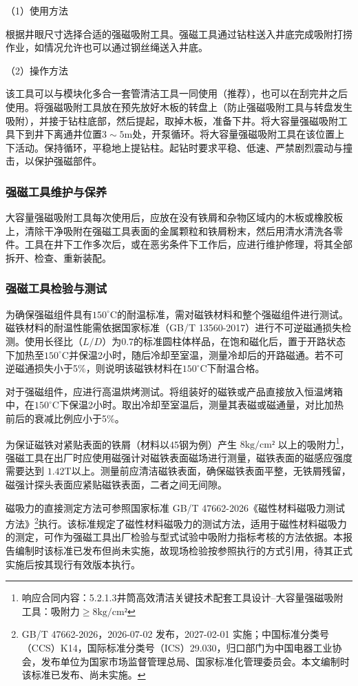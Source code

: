 （1）使用方法

根据井眼尺寸选择合适的强磁吸附工具。强磁工具通过钻柱送入井底完成吸附打捞作业，如情况允许也可以通过钢丝绳送入井底。

（2）操作方法

该工具可以与模块化多合一套管清洁工具一同使用（推荐），也可以在刮完井之后使用。将强磁吸附工具放在预先放好木板的转盘上（防止强磁吸附工具与转盘发生吸附），并接于钻柱底部，然后提起，取掉木板，准备下井。将大容量强磁吸附工具下到井下离通井位置$3\sim 5\mathrm{m}$处，开泵循环。将大容量强磁吸附工具在该位置上下活动。保持循环，平稳地上提钻柱。起钻时要求平稳、低速、严禁剧烈震动与撞击，以保护强磁部件。

\subsubsection{强磁工具维护与保养}

大容量强磁吸附工具每次使用后，应放在没有铁屑和杂物区域内的木板或橡胶板上，清除干净吸附在强磁工具表面的金属颗粒和铁屑粉末，然后用清水清洗各零件。工具在井下工作多次后，或在恶劣条件下工作后，应进行维护修理，将其全部拆开、检查、重新装配。

\subsubsection{强磁工具检验与测试}

为确保强磁组件具有$150^{\circ}\mathrm{C}$的耐温标准，需对磁铁材料和整个强磁组件进行测试。磁铁材料的耐温性能需依据国家标准（GB/T 13560-2017）进行不可逆磁通损失检测。使用长径比（$L/D$）为$0.7$的标准圆柱体样品，在饱和磁化后，置于开路状态下加热至$150^{\circ}\mathrm{C}$并保温2小时，随后冷却至室温，测量冷却后的开路磁通。若不可逆磁通损失小于5\%，则说明该磁铁材料在$150^{\circ}\mathrm{C}$下耐温合格。

对于强磁组件，应进行高温烘烤测试。将组装好的磁铁或产品直接放入恒温烤箱中，在$150^{\circ}\mathrm{C}$下保温2小时。取出冷却至室温后，测量其表磁或磁通量，对比加热前后的衰减比例应小于5\%。

为保证磁铁对紧贴表面的铁屑（材料以45钢为例）产生 $8 \mathrm{kg/cm²}$ 以上的吸附力\footnote{响应合同内容：5.2.1.3井筒高效清洁关键技术配套工具设计--大容量强磁吸附工具：吸附力$\ge 8 \mathrm{kg/cm²}$}，强磁工具在出厂时应使用磁强计对磁铁表面磁场进行测量，磁铁表面的磁感应强度需要达到 $1.42 \mathrm{T}$以上。测量前应清洁磁铁表面，确保磁铁表面平整，无铁屑残留，磁强计探头表面应紧贴磁铁表面，二者之间无间隙。

磁吸力的直接测定方法可参照国家标准 GB/T 47662-2026《磁性材料磁吸力测试方法》\footnote{GB/T 47662-2026，2026-07-02 发布，2027-02-01 实施；中国标准分类号（CCS）K14，国际标准分类号（ICS）29.030，归口部门为中国电器工业协会，发布单位为国家市场监督管理总局、国家标准化管理委员会。本文编制时该标准已发布、尚未实施。}执行。该标准规定了磁性材料磁吸力的测试方法，适用于磁性材料磁吸力的测定，可作为强磁工具出厂检验与型式试验中吸附力指标考核的方法依据。本报告编制时该标准已发布但尚未实施，故现场检验按参照执行的方式引用，待其正式实施后按其现行有效版本执行。

